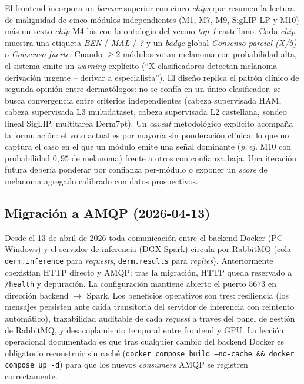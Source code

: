 El frontend incorpora un \emph{banner} superior con cinco
\emph{chips} que resumen la lectura de malignidad de cinco
módulos independientes (M1, M7, M9, SigLIP-LP y M10) más un sexto
\emph{chip} M4-bis con la ontología del vecino \emph{top-1}
castellano. Cada \emph{chip} muestra una etiqueta \emph{BEN}
/ \emph{MAL} / \emph{?} y un \emph{badge} global \emph{Consenso
parcial (X/5)} o \emph{Consenso fuerte}. Cuando $\geq 2$
módulos votan melanoma con probabilidad alta, el sistema emite
un \emph{warning} explícito (``X clasificadores detectan
melanoma -- derivación urgente -- derivar a especialista''). El
diseño replica el patrón clínico de segunda opinión entre
dermatólogos: no se confía en un único clasificador, se busca
convergencia entre criterios independientes (cabeza supervisada
HAM, cabeza supervisada L3 multidataset, cabeza supervisada L2
castellana, sondeo lineal SigLIP, multitarea Derm7pt). Un
\emph{caveat} metodológico explícito acompaña la formulación: el
voto actual es por mayoría sin ponderación clínica, lo que no
captura el caso en el que un módulo emite una señal dominante
(\emph{p.\,ej.} M10 con probabilidad $0{,}95$ de melanoma) frente
a otros con confianza baja. Una iteración futura debería
ponderar por confianza per-módulo o exponer un \emph{score} de
melanoma agregado calibrado con datos prospectivos.

\subsection{Migración a AMQP (2026-04-13)}
\label{sec:dermapixel-amqp-migracion}

Desde el 13 de abril de 2026 toda comunicación entre el backend
Docker (PC Windows) y el servidor de inferencia (DGX Spark)
circula por RabbitMQ (cola \texttt{derm.inference} para
\emph{requests}, \texttt{derm.results} para \emph{replies}).
Anteriormente coexistían HTTP directo y AMQP; tras la migración,
HTTP queda reservado a \texttt{/health} y depuración. La
configuración mantiene abierto el puerto $5673$ en dirección
backend $\to$ Spark. Los beneficios operativos son tres:
resiliencia (los mensajes persisten ante caída transitoria del
servidor de inferencia con reintento automático), trazabilidad
auditable de cada \emph{request} a través del panel de gestión
de RabbitMQ, y desacoplamiento temporal entre frontend y GPU. La
lección operacional documentada es que tras cualquier cambio
del backend Docker es obligatorio reconstruir sin caché
(\texttt{docker compose build --no-cache \&\& docker compose up
-d}) para que los nuevos \emph{consumers} AMQP se registren
correctamente.

